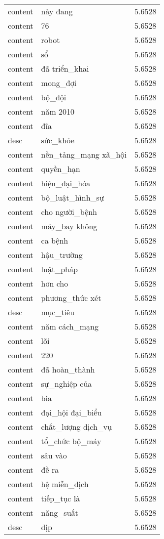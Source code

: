 \documentclass{article}
\begin{document}
\begin{tabular}{lll}
content & này đang & 5.6528\\
content & 76 & 5.6528\\
content & robot & 5.6528\\
content & sổ & 5.6528\\
content & đã triển\_khai & 5.6528\\
content & mong\_đợi & 5.6528\\
content & bộ\_đội & 5.6528\\
content & năm 2010 & 5.6528\\
content & đĩa & 5.6528\\
desc & sức\_khỏe & 5.6528\\
content & nền\_tảng\_mạng xã\_hội & 5.6528\\
content & quyền\_hạn & 5.6528\\
content & hiện\_đại\_hóa & 5.6528\\
content & bộ\_luật\_hình\_sự & 5.6528\\
content & cho người\_bệnh & 5.6528\\
content & máy\_bay không & 5.6528\\
content & ca bệnh & 5.6528\\
content & hậu\_trường & 5.6528\\
content & luật\_pháp & 5.6528\\
content & hơn cho & 5.6528\\
content & phương\_thức xét & 5.6528\\
desc & mục\_tiêu & 5.6528\\
content & năm cách\_mạng & 5.6528\\
content & lõi & 5.6528\\
content & 220 & 5.6528\\
content & đã hoàn\_thành & 5.6528\\
content & sự\_nghiệp của & 5.6528\\
content & bia & 5.6528\\
content & đại\_hội đại\_biểu & 5.6528\\
content & chất\_lượng dịch\_vụ & 5.6528\\
content & tổ\_chức bộ\_máy & 5.6528\\
content & sâu vào & 5.6528\\
content & đề ra & 5.6528\\
content & hệ miễn\_dịch & 5.6528\\
content & tiếp\_tục là & 5.6528\\
content & năng\_suất & 5.6528\\
desc & dịp & 5.6528\\

\end{tabular}
\end{document}
